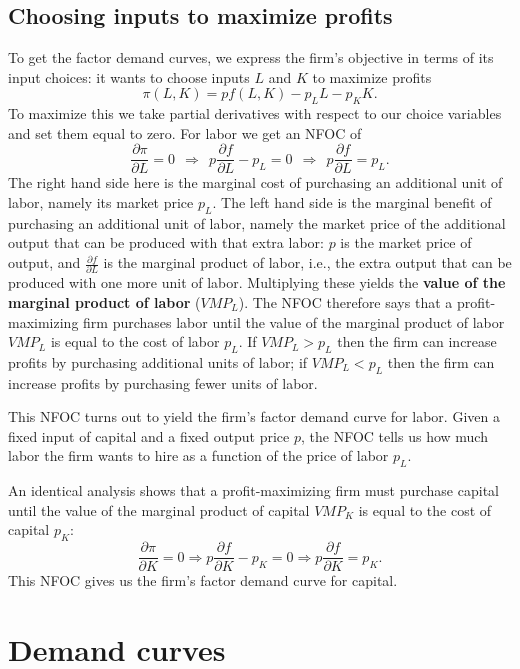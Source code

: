 \subsection*{Choosing inputs to maximize profits}

To get the factor demand curves, we express the firm's objective in terms of its input choices: it wants to choose inputs $L$ and $K$ to maximize profits
\[
\pi (L, K) = p f(L, K) - p_L L - p_K K.
\]
To maximize this we take partial derivatives with respect to our choice variables and set them equal to zero. For labor we get an NFOC of
\[
\frac{\partial\pi}{\partial L}=0\ \ \Longrightarrow \ \
p\frac{\partial f}{\partial L} - p_L=0\ \ \Longrightarrow \ \
p\frac{\partial f}{\partial L} = p_L.
\]
The right hand side here is the marginal cost of purchasing an additional unit of labor, namely its market price $p_L$. The left hand side is the marginal benefit of purchasing an additional unit of labor, namely the market price of the additional output that can be produced with that extra labor: $p$ is the market price of output, and $\displaystyle \frac{\partial f}{\partial L}$ is the marginal product of labor, i.e., the extra output that can be produced with one more unit of labor. Multiplying these yields the \textbf{value of the marginal product of labor} ($VMP_L$). The NFOC therefore says that a profit-maximizing firm purchases labor until the value of the marginal product of labor $VMP_L$ is equal to the cost of labor $p_L$. If $VMP_L>p_L$ then the firm can increase profits by purchasing additional units of labor; if $VMP_L<p_L$ then the firm can increase profits by purchasing fewer units of labor.

This NFOC turns out to yield the firm's factor demand curve for labor. Given a fixed input of capital and a fixed output price $p$, the NFOC tells us how much labor the firm wants to hire as a function of the price of labor $p_L$.

An identical analysis shows that a profit-maximizing firm must purchase capital until the value of the marginal product of capital $VMP_K$ is equal to the cost of capital $p_K$:
\[
\frac{\partial\pi}{\partial K}=0\Longrightarrow p\frac{\partial
f}{\partial K} - p_K=0\Longrightarrow p\frac{\partial f}{\partial
K} = p_K.
\]
This NFOC gives us the firm's factor demand curve for capital.




\section{Demand curves}

